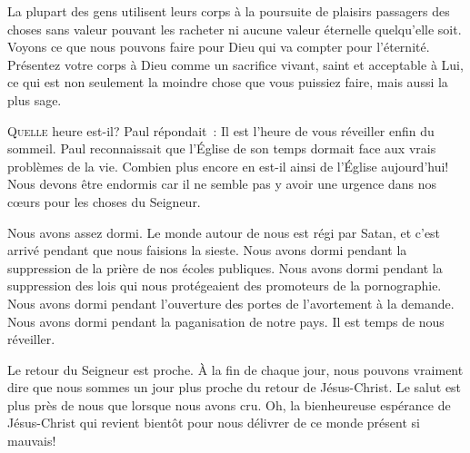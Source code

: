 La plupart des gens utilisent leurs corps à la poursuite de plaisirs passagers
 \ocadr des choses sans valeur pouvant les racheter ni aucune valeur éternelle
 quelqu'elle soit. Voyons ce que nous pouvons faire pour Dieu qui va compter
 pour l'éternité. Présentez votre corps à Dieu comme un sacrifice vivant,
 saint et acceptable à Lui, ce qui est non seulement la moindre chose
 que vous puissiez faire, mais aussi la plus sage.

\dvrule






\lettrine{Q}{uelle} heure est-il?
 Paul répondait~: 
 \Og Il est l'heure de vous réveiller enfin du sommeil. \Fg{}
 Paul reconnaissait que l'Église  de son temps
 dormait face aux vrais problèmes de la vie.
 Combien plus encore en est-il ainsi de l'Église  aujourd'hui!
 Nous devons être endormis car il ne semble pas y avoir une urgence
 dans nos c\oe{}urs pour les choses du Seigneur.

Nous avons assez dormi. Le monde autour de nous est régi par Satan,
 et c'est arrivé pendant que nous faisions la sieste.
 Nous avons dormi pendant la suppression de la prière
 de nos écoles publiques. Nous avons dormi pendant la suppression
 des lois qui nous protégeaient des promoteurs de la pornographie.
 Nous avons dormi pendant l'ouverture des portes de l'avortement à la demande.
 Nous avons dormi pendant la paganisation de notre pays.
 Il est temps de nous réveiller.


Le retour du Seigneur est proche.
 À la fin de chaque jour, nous pouvons vraiment dire que nous sommes
 un jour plus proche du retour de Jésus-Christ.
 Le salut est plus près de nous que lorsque nous avons cru.
 Oh, la bienheureuse espérance de Jésus-Christ qui revient bientôt
 pour nous délivrer de ce monde présent si mauvais!


